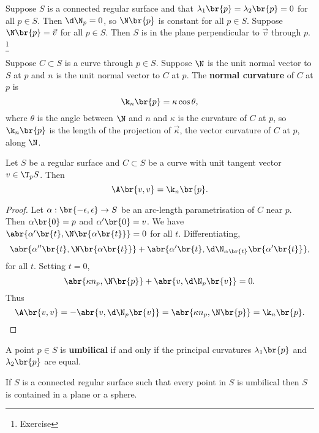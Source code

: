 \begin{example*}
Suppose $ S $ is a connected regular surface and that $ \lambda_1\br{p} = \lambda_2\br{p} = 0 $ for all $ p \in S $. Then $ \d\N_p = 0 $, so $ \N\br{p} $ is constant for all $ p \in S $. Suppose $ \N\br{p} = \vec{v} $ for all $ p \in S $. Then $ S $ is in the plane perpendicular to $ \vec{v} $ through $ p $. \footnote{Exercise}
\end{example*}

\begin{definition}
Suppose $ C \subset S $ is a curve through $ p \in S $. Suppose $ \N $ is the unit normal vector to $ S $ at $ p $ and $ n $ is the unit normal vector to $ C $ at $ p $. The \textbf{normal curvature} of $ C $ at $ p $ is
$$ \k_n\br{p} = \kappa\cos \theta, $$
where $ \theta $ is the angle between $ \N $ and $ n $ and $ \kappa $ is the curvature of $ C $ at $ p $, so $ \k_n\br{p} $ is the length of the projection of $ \vec{\kappa} $, the vector curvature of $ C $ at $ p $, along $ \N $.
\end{definition}

\begin{proposition}
Let $ S $ be a regular surface and $ C \subset S $ be a curve with unit tangent vector $ v \in \T_p S $. Then
$$ \A\br{v, v} = \k_n\br{p}. $$
\end{proposition}

\begin{proof}
Let $ \alpha : \br{-\epsilon, \epsilon} \to S $ be an arc-length parametrisation of $ C $ near $ p $. Then $ \alpha\br{0} = p $ and $ \alpha'\br{0} = v $. We have $ \abr{\alpha'\br{t}, \N\br{\alpha\br{t}}} = 0 $ for all $ t $. Differentiating,
$$ \abr{\alpha''\br{t}, \N\br{\alpha\br{t}}} + \abr{\alpha'\br{t}, \d\N_{\alpha\br{t}}\br{\alpha'\br{t}}}, $$
for all $ t $. Setting $ t = 0 $,
$$ \abr{\kappa n_p, \N\br{p}} + \abr{v, \d\N_p\br{v}} = 0. $$
Thus
$$ \A\br{v, v} = -\abr{v, \d\N_p\br{v}} = \abr{\kappa n_p, \N\br{p}} = \k_n\br{p}. $$
\end{proof}

\pagebreak

\begin{definition}
A point $ p \in S $ is \textbf{umbilical} if and only if the principal curvatures $ \lambda_1\br{p} $ and $ \lambda_2\br{p} $ are equal.
\end{definition}

\begin{proposition}
If $ S $ is a connected regular surface such that every point in $ S $ is umbilical then $ S $ is contained in a plane or a sphere.
\end{proposition}

